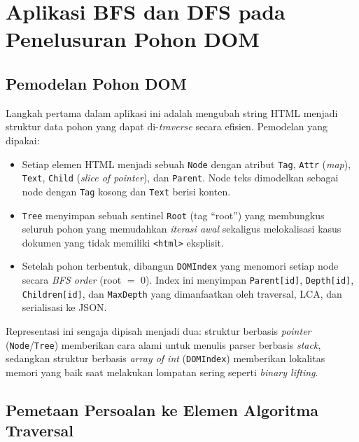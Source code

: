 \chapter{Aplikasi BFS dan DFS pada Penelusuran Pohon DOM}

\section{Pemodelan Pohon DOM}

Langkah pertama dalam aplikasi ini adalah mengubah string HTML menjadi struktur data pohon yang dapat di-\textit{traverse} secara efisien. Pemodelan yang dipakai:

\begin{itemize}
    \item Setiap elemen HTML menjadi sebuah \texttt{Node} dengan atribut \texttt{Tag}, \texttt{Attr} (\textit{map}), \texttt{Text}, \texttt{Child} (\textit{slice of pointer}), dan \texttt{Parent}. Node teks dimodelkan sebagai node dengan \texttt{Tag} kosong dan \texttt{Text} berisi konten.
    \item \texttt{Tree} menyimpan sebuah sentinel \texttt{Root} (tag ``root'') yang membungkus seluruh pohon yang memudahkan \textit{iterasi awal} sekaligus melokalisasi kasus dokumen yang tidak memiliki \texttt{<html>} eksplisit.
    \item Setelah pohon terbentuk, dibangun \texttt{DOMIndex} yang menomori setiap node secara \textit{BFS order} (root $=$ 0). Index ini menyimpan \texttt{Parent[id]}, \texttt{Depth[id]}, \texttt{Children[id]}, dan \texttt{MaxDepth} yang dimanfaatkan oleh traversal, LCA, dan serialisasi ke JSON.
\end{itemize}

Representasi ini sengaja dipisah menjadi dua: struktur berbasis \textit{pointer} (\texttt{Node}/\texttt{Tree}) memberikan cara alami untuk menulis parser berbasis \textit{stack}, sedangkan struktur berbasis \textit{array of int} (\texttt{DOMIndex}) memberikan lokalitas memori yang baik saat melakukan lompatan sering seperti \textit{binary lifting}.

\section{Pemetaan Persoalan ke Elemen Algoritma Traversal}

